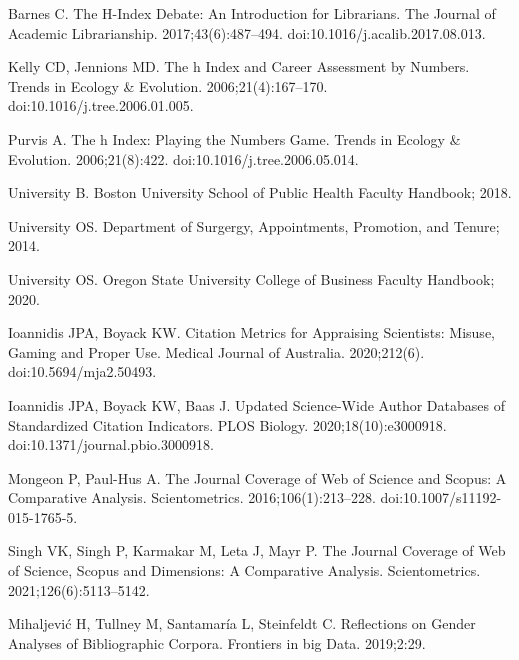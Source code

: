 \documentclass[
  10pt,
  letterpaper,
]{article}
\begin{document}
\begin{thebibliography}{10}
Barnes C.
\newblock The H-Index {{Debate}}: {{An Introduction}} for {{Librarians}}.
\newblock The Journal of Academic Librarianship. 2017;43(6):487--494.
\newblock doi:{10.1016/j.acalib.2017.08.013}.

Kelly CD, Jennions MD.
\newblock The h Index and Career Assessment by Numbers.
\newblock Trends in Ecology \& Evolution. 2006;21(4):167--170.
\newblock doi:{10.1016/j.tree.2006.01.005}.

Purvis A.
\newblock The h Index: Playing the Numbers Game.
\newblock Trends in Ecology \& Evolution. 2006;21(8):422.
\newblock doi:{10.1016/j.tree.2006.05.014}.

University B.
\newblock Boston {{University School}} of {{Public Health Faculty Handbook}}; 2018.

University OS.
\newblock Department of {{Surgergy}}, {{Appointments}}, {{Promotion}}, and {{Tenure}}; 2014.

University OS.
\newblock Oregon {{State University College}} of {{Business Faculty Handbook}}; 2020.

Ioannidis JPA, Boyack KW.
\newblock Citation Metrics for Appraising Scientists: Misuse, Gaming and Proper Use.
\newblock Medical Journal of Australia. 2020;212(6).
\newblock doi:{10.5694/mja2.50493}.

Ioannidis JPA, Boyack KW, Baas J.
\newblock Updated Science-Wide Author Databases of Standardized Citation Indicators.
\newblock PLOS Biology. 2020;18(10):e3000918.
\newblock doi:{10.1371/journal.pbio.3000918}.

Mongeon P, {Paul-Hus} A.
\newblock The Journal Coverage of {{Web}} of {{Science}} and {{Scopus}}: A Comparative Analysis.
\newblock Scientometrics. 2016;106(1):213--228.
\newblock doi:{10.1007/s11192-015-1765-5}.

Singh VK, Singh P, Karmakar M, Leta J, Mayr P.
\newblock The Journal Coverage of {{Web}} of {{Science}}, {{Scopus}} and {{Dimensions}}: {{A}} Comparative Analysis.
\newblock Scientometrics. 2021;126(6):5113--5142.

Mihaljevi{\'c} H, Tullney M, Santamar{\'i}a L, Steinfeldt C.
\newblock Reflections on Gender Analyses of Bibliographic Corpora.
\newblock Frontiers in big Data. 2019;2:29.


\end{thebibliography}
\end{document}
